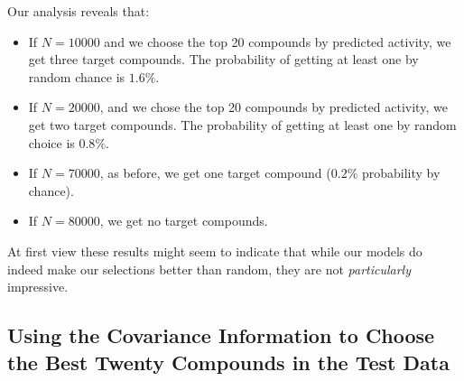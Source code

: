 \documentclass[journal=jacsat,manuscript=article]{achemso}
\begin{document}
Our analysis reveals that:
\begin{itemize}
    \item If $N=10000$ and we choose the top 20 compounds by predicted activity, we get three target compounds.  The probability of getting at least one by random chance is $1.6\%$.
    \item If $N=20000$, and we chose the top 20 compounds by predicted activity, we get two target compounds.  The probability of getting at least one by random choice is $0.8\%$.
    \item If $N=70000$, as before, we get one target compound ($0.2\%$ probability by chance).
    \item If $N=80000$, we get no target compounds.
\end{itemize}

At first view these results might seem to indicate that while our models do indeed make our selections better than random, they are not \textit{particularly} impressive.

\subsection*{Using the Covariance Information to Choose the Best Twenty Compounds in the Test Data}
\end{document}
